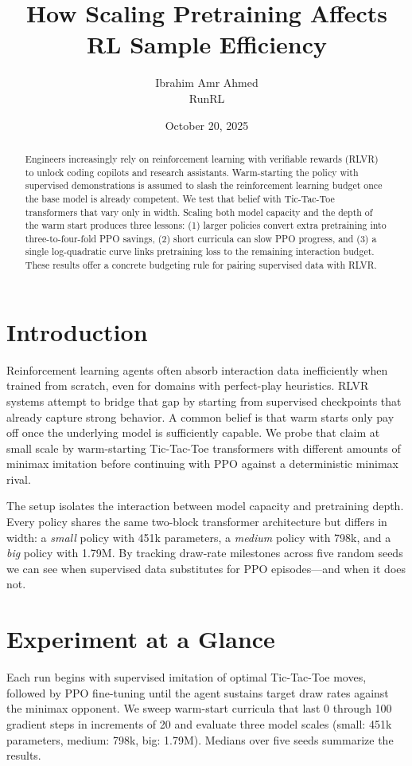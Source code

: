 \documentclass[11pt]{article}
\title{How Scaling Pretraining Affects RL Sample Efficiency}
\author{Ibrahim Amr Ahmed\\RunRL}
\date{October 20, 2025}
\begin{document}
\maketitle

\begin{abstract}
Engineers increasingly rely on reinforcement learning with verifiable rewards (RLVR) to unlock coding copilots and research assistants. Warm-starting the policy with supervised demonstrations is assumed to slash the reinforcement learning budget once the base model is already competent. We test that belief with Tic-Tac-Toe transformers that vary only in width. Scaling both model capacity and the depth of the warm start produces three lessons: (1) larger policies convert extra pretraining into three-to-four-fold PPO savings, (2) short curricula can slow PPO progress, and (3) a single log-quadratic curve links pretraining loss to the remaining interaction budget. These results offer a concrete budgeting rule for pairing supervised data with RLVR.
\end{abstract}

\section{Introduction}
Reinforcement learning agents often absorb interaction data inefficiently when trained from scratch, even for domains with perfect-play heuristics. RLVR systems attempt to bridge that gap by starting from supervised checkpoints that already capture strong behavior. A common belief is that warm starts only pay off once the underlying model is sufficiently capable. We probe that claim at small scale by warm-starting Tic-Tac-Toe transformers with different amounts of minimax imitation before continuing with PPO against a deterministic minimax rival.

The setup isolates the interaction between model capacity and pretraining depth. Every policy shares the same two-block transformer architecture but differs in width: a \emph{small} policy with 451k parameters, a \emph{medium} policy with 798k, and a \emph{big} policy with 1.79M. By tracking draw-rate milestones across five random seeds we can see when supervised data substitutes for PPO episodes---and when it does not.

\section{Experiment at a Glance}
Each run begins with supervised imitation of optimal Tic-Tac-Toe moves, followed by PPO fine-tuning until the agent sustains target draw rates against the minimax opponent. We sweep warm-start curricula that last 0 through 100 gradient steps in increments of 20 and evaluate three model scales (small: 451k parameters, medium: 798k, big: 1.79M). Medians over five seeds summarize the results.
\end{document}
